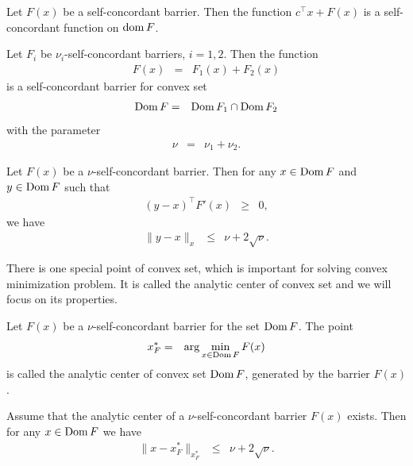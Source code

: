 \begin{theorem}
  Let $F(x)$ be a self-concordant barrier. Then the function $c^\top x + F(x)$ is a self-concordant function on $\operatorname{dom} F$.
\end{theorem}

\begin{theorem}
  Let $F_i$ be $\nu_i$-self-concordant barriers, $i = 1,2$. Then the function
  \begin{eqnarray}
    F(x) &=& F_1(x) + F_2(x)
  \end{eqnarray}
  is a self-concordant barrier for convex set
  \begin{eqnarray}
    \operatorname{Dom} F &=& \operatorname{Dom} F_1 \cap \operatorname{Dom} F_2
  \end{eqnarray}
  with the parameter
  \begin{eqnarray}
    \nu &=& \nu_1 + \nu_2.
  \end{eqnarray}
\end{theorem}

\begin{theorem}
  Let $F(x)$ be a $\nu$-self-concordant barrier. Then for any $x\in\operatorname{Dom} F$ and $y\in\operatorname{Dom} F$ such that
  \begin{eqnarray}
    (y-x)^\top F'(x) &\geq& 0,
  \end{eqnarray}
  we have
  \begin{eqnarray}
    \|y-x\|_x &\leq& \nu + 2\sqrt{\nu}.
  \end{eqnarray}
\end{theorem}

There is one special point of convex set, which is important for solving convex minimization problem. 
It is called the analytic center of convex set and we will focus on its properties.

\begin{definition}
  Let $F(x)$ be a $\nu$-self-concordant barrier for the set $\operatorname{Dom} F$. The point
  \begin{eqnarray}
    x^*_F &=& \arg \min_{x\in\Dom F} F(x) \labeleq{SDP:scb:ac}
  \end{eqnarray}
  is called the analytic center of convex set $\operatorname{Dom} F$, generated by the barrier $F(x)$.
\end{definition}

\begin{theorem}
  Assume that the analytic center of a $\nu$-self-concordant barrier $F(x)$ exists. Then for any $x\in\operatorname{Dom} F$ we have
  \begin{eqnarray}
    \|x-x^*_F\|_{x^*_F} &\leq& \nu + 2\sqrt{\nu}.
  \end{eqnarray}
\end{theorem}

